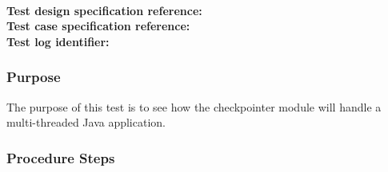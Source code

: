 


\\
\noindent\textbf{Test design specification reference: } \\%
\noindent\textbf{Test case specification reference: } \\
\noindent\textbf{Test log identifier: } %




\subsubsection{Purpose}
The purpose of this test is to see how the checkpointer module will handle a multi-threaded Java application.

\subsubsection{Procedure Steps}

